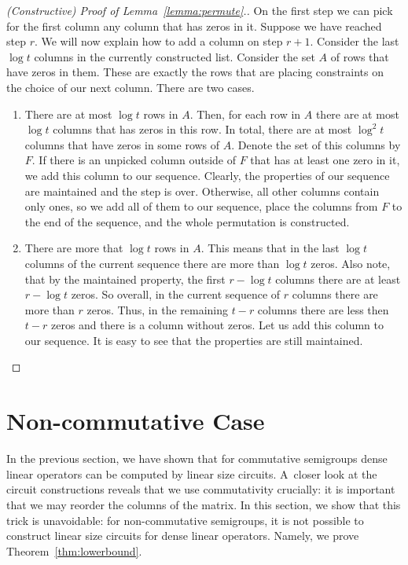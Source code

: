 \documentclass[11pt,letterpaper]{article}
\begin{document}
\begin{proof}[(Constructive) Proof of Lemma~\ref{lemma:permute}.]
On the first step we can pick for the first column any column that has zeros in it. Suppose we have reached step $r$. We will now explain how to add a column on step $r+1$. Consider the last $\log t$ columns in the currently constructed list. Consider the set $A$ of rows that have zeros in them. These are exactly the rows that are placing constraints on the choice of our next column. There are two cases.
\begin{enumerate}
\item There are at most $\log t$ rows in $A$. Then, for each row in $A$ there are at most $\log t$ columns that has zeros in this row. In total, there are at most $\log^2 t$ columns that have zeros in some rows of $A$. Denote the set of this columns by $F$. If there is an unpicked column outside of $F$ that has at least one zero in it, we add this column to our sequence. Clearly, the properties of our sequence are maintained and the step is over. Otherwise, all other columns contain only ones, so we add all of them to our sequence, place the columns from $F$ to the end of the sequence, and the whole permutation is constructed.
\item There are more that $\log t$ rows in $A$. This means that in the last $\log t$ columns of the current sequence there are more than $\log t$ zeros. Also note, that by the maintained property, the first $r - \log t$ columns there are at least $r - \log t$ zeros. So overall, in the current sequence of $r$ columns there are more than $r$ zeros. Thus, in the remaining $t-r$ columns there are less then $t-r$ zeros and there is a column without zeros. Let us add this column to our sequence. It is easy to see that the properties are still maintained.
\end{enumerate}
\end{proof}




\section{Non-commutative Case}\label{sec-non-commutative}

In the previous section, we have shown that for commutative semigroups dense linear operators can be computed by linear size circuits. A~closer look at the circuit constructions reveals that we use commutativity crucially: it is important that we may reorder the columns of the matrix. In this section, we show that this trick is unavoidable: for non-commutative semigroups, it is not possible to construct linear size circuits for dense linear operators. Namely, we prove Theorem~\ref{thm:lowerbound}.
\end{document}
